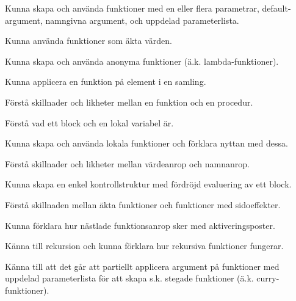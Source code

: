 
\item Kunna skapa och använda funktioner med en eller flera parametrar, default-argument, namngivna argument, och uppdelad parameterlista.
\item Kunna använda funktioner som äkta värden.
\item Kunna skapa och använda anonyma funktioner (ä.k. lambda-funktioner).
\item Kunna applicera en funktion på element i en samling.
\item Förstå skillnader och likheter mellan en funktion och en procedur.
\item Förstå vad ett block och en lokal variabel är.
\item Kunna skapa och använda lokala funktioner och förklara nyttan med dessa.
\item Förstå skillnader och likheter mellan värdeanrop och namnanrop.
\item Kunna skapa en enkel kontrollstruktur med fördröjd evaluering av ett block.
\item Förstå skillnaden mellan äkta funktioner och funktioner med sidoeffekter.
\item Kunna förklara hur nästlade funktionsanrop sker med   aktiveringsposter.
\item Känna till rekursion och kunna förklara hur rekursiva funktioner fungerar.
\item Känna till att det går att partiellt applicera argument på funktioner med uppdelad parameterlista för att skapa s.k. stegade funktioner (ä.k. curry-funktioner).

